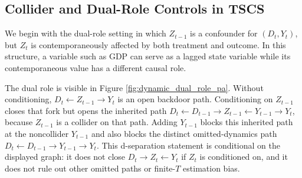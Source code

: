 \documentclass[
]{article}
\begin{document}
\subsection{Collider and Dual-Role Controls in
TSCS}\label{collider-and-dual-role-controls-in-tscs}

We begin with the dual-role setting in which \(Z_{t-1}\) is a confounder
for \((D_t, Y_t)\), but \(Z_t\) is contemporaneously affected by both
treatment and outcome. In this structure, a variable such as GDP can
serve as a lagged state variable while its contemporaneous value has a
different causal role.

The dual role is visible in Figure \ref{fig:dynamic_dual_role_pa}.
Without conditioning, \(D_t\leftarrow Z_{t-1}\rightarrow Y_t\) is an
open backdoor path. Conditioning on \(Z_{t-1}\) closes that fork but
opens the inherited path
\(D_t\leftarrow D_{t-1}\rightarrow Z_{t-1}\leftarrow Y_{t-1}\rightarrow Y_t\),
because \(Z_{t-1}\) is a collider on that path. Adding \(Y_{t-1}\)
blocks this inherited path at the noncollider \(Y_{t-1}\) and also
blocks the distinct omitted-dynamics path
\(D_t\leftarrow D_{t-1}\rightarrow Y_{t-1}\rightarrow Y_t\). This
d-separation statement is conditional on the displayed graph: it does
not close \(D_t\rightarrow Z_t\leftarrow Y_t\) if \(Z_t\) is conditioned
on, and it does not rule out other omitted paths or finite-\(T\)
estimation bias.
\end{document}
